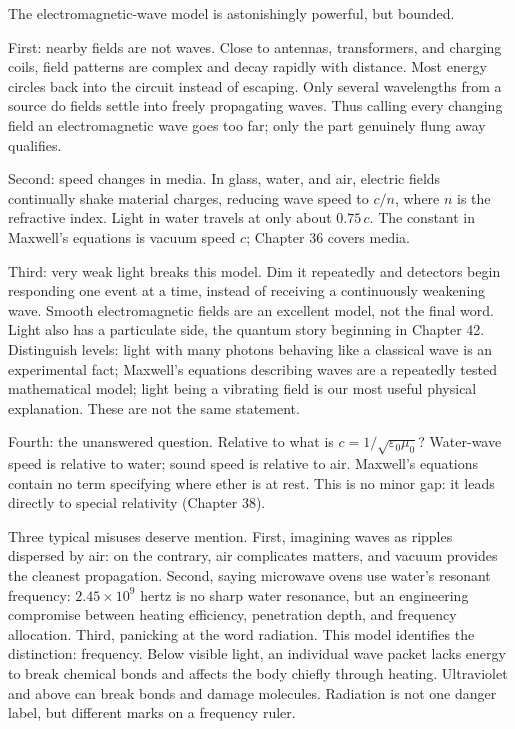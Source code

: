 
\begin{mainline}
The electromagnetic-wave model is astonishingly powerful, but bounded.

First: nearby fields are not waves. Close to antennas, transformers, and charging coils, field patterns are complex and decay rapidly with distance. Most energy circles back into the circuit instead of escaping. Only several wavelengths from a source do fields settle into freely propagating waves. Thus calling every changing field an electromagnetic wave goes too far; only the part genuinely flung away qualifies.

Second: speed changes in media. In glass, water, and air, electric fields continually shake material charges, reducing wave speed to $c/n$, where $n$ is the refractive index. Light in water travels at only about $0.75\,c$. The constant in Maxwell's equations is vacuum speed $c$; Chapter 36 covers media.

Third: very weak light breaks this model. Dim it repeatedly and detectors begin responding one event at a time, instead of receiving a continuously weakening wave. Smooth electromagnetic fields are an excellent model, not the final word. Light also has a particulate side, the quantum story beginning in Chapter 42. Distinguish levels: light with many photons behaving like a classical wave is an experimental fact; Maxwell's equations describing waves are a repeatedly tested mathematical model; light being a vibrating field is our most useful physical explanation. These are not the same statement.

Fourth: the unanswered question. Relative to what is $c=1/\sqrt{\varepsilon_0\mu_0}$? Water-wave speed is relative to water; sound speed is relative to air. Maxwell's equations contain no term specifying where ether is at rest. This is no minor gap: it leads directly to special relativity (Chapter 38).

Three typical misuses deserve mention. First, imagining waves as ripples dispersed by air: on the contrary, air complicates matters, and vacuum provides the cleanest propagation. Second, saying microwave ovens use water's resonant frequency: $2.45\times10^{9}$ hertz is no sharp water resonance, but an engineering compromise between heating efficiency, penetration depth, and frequency allocation. Third, panicking at the word radiation. This model identifies the distinction: frequency. Below visible light, an individual wave packet lacks energy to break chemical bonds and affects the body chiefly through heating. Ultraviolet and above can break bonds and damage molecules. Radiation is not one danger label, but different marks on a frequency ruler.
\end{mainline}

